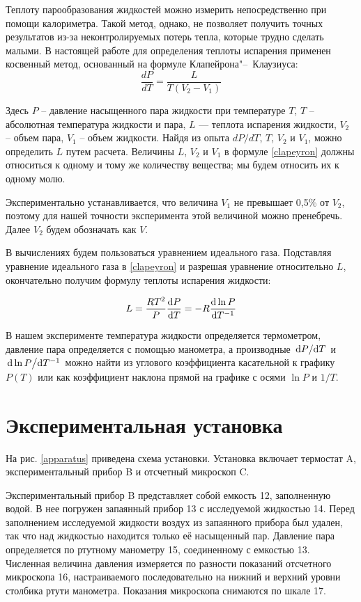 \documentclass[a4paper,12pt]{article}
\begin{document}
  Теплоту парообразования жидкостей можно измерить непосредственно при помощи калориметра. Такой метод, однако, не позволяет получить точных результатов из-за неконтролируемых потерь тепла, которые трудно сделать малыми. В настоящей работе для определения теплоты испарения применен косвенный метод, основанный на формуле Клапейрона"--~Клаузиуса:
  \begin{equation}
      \label{clapeyron}
      \frac{dP}{dT} = \frac{L}{T(V_2 - V_1)}
  \end{equation}

  Здесь $P$ -- давление насыщенного пара жидкости при температуре $T$, $T$ -- абсолютная температура жидкости и пара, $L$ — теплота испарения жидкости, $V_2$ -- объем пара, $V_1$ -- объем жидкости. Найдя из опыта $dP/dT$, $T$, $V_2$ и $V_1$, можно определить $L$ путем расчета. Величины $L$, $V_2$ и $V_1$ в формуле \eqref{clapeyron} должны относиться к одному и тому же количеству вещества; мы будем относить их к одному молю.

  Экспериментально устанавливается, что величина $V_1$ не превышает 0,5\%  от $V_2$, поэтому для нашей точности эксперимента этой величиной можно пренебречь. Далее $V_2$ будем обозначать как $V$.

  В вычислениях будем пользоваться уравнением идеального газа. Подставляя уравнение идеального газа в \eqref{clapeyron} и разрешая уравнение относительно $L$, окончательно получим  формулу теплоты испарения жидкости:

  \begin{equation}
      \label{L}
      L = \frac{RT^2}{P} \dv{P}{T} = -R \dv{\ln P}{T^{-1}}
  \end{equation}
  \break

  В нашем эксперименте температура жидкости определяется термометром, давление пара определяется с помощью манометра, а производные  $\dv*{P}{T}$ и $\dv*{\ln P}{T^{-1}}$ можно найти из углового коэффициента касательной к графику  $P(T)$ или как коэффициент наклона прямой на графике с осями $\ln P$ и $1/T$.

\section{Экспериментальная установка}

  На рис. \ref{apparatus} приведена схема установки. Установка включает термостат A, экспериментальный прибор B и отсчетный микроскоп C.

  Экспериментальный прибор B представляет собой емкость 12, заполненную водой. В нее погружен запаянный прибор 13 с исследуемой жидкостью 14. Перед заполнением исследуемой жидкости воздух из запаянного прибора был удален, так что над жидкостью находится только её насыщенный пар. Давление пара определяется по ртутному манометру 15, соединенному с емкостью 13. Численная величина давления измеряется по разности показаний отсчетного микроскопа 16, настраиваемого последовательно на нижний и верхний уровни столбика ртути манометра. Показания микроскопа снимаются по шкале 17.
\end{document}
